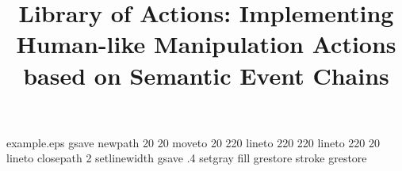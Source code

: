%
%
%
%
%
\begin{filecontents*}{example.eps}
gsave
newpath
  20 20 moveto
  20 220 lineto
  220 220 lineto
  220 20 lineto
closepath
2 setlinewidth
gsave
  .4 setgray fill
grestore
stroke
grestore
\end{filecontents*}
%
\RequirePackage{fix-cm}
%
\documentclass[smallcondensed]{svjour3}     %
%
\smartqed  %
%
\usepackage{graphicx}
\usepackage{amsmath}
\usepackage{url}
\usepackage{color}
%
%
%
%
%


\title{Library of Actions: Implementing Human-like Manipulation Actions based on Semantic Event Chains%
}


